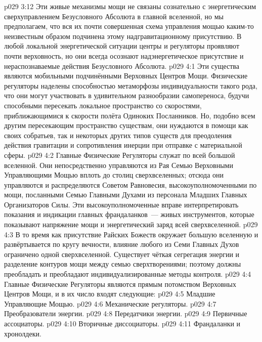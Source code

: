 \vs p029 3:12 Эти живые механизмы мощи не связаны сознательно с энергетическим сверхуправлением Безусловного Абсолюта в главной вселенной, но мы предполагаем, что вся их почти совершенная схема управления мощью каким\hyp{}то неизвестным образом подчинена этому надгравитационному присутствию. В любой локальной энергетической ситуации центры и регуляторы проявляют почти верховность, но они всегда осознают надэнергетическое присутствие и нераспознаваемые действия Безусловного Абсолюта.
\vs p029 4:1 Эти существа являются мобильными подчинёнными Верховных Центров Мощи. Физические регуляторы наделены способностью метаморфозы индивидуальности такого рода, что они могут участвовать в удивительном разнообразии самопереноса, будучи способными пересекать локальное пространство со скоростями, приближающимися к скорости полёта Одиноких Посланников. Но, подобно всем другим пересекающим пространство существам, они нуждаются в помощи как своих собратьев, так и некоторых других типов существ для преодоления действия гравитации и сопротивления инерции при отправке с материальной сферы.
\vs p029 4:2 Главные Физические Регуляторы служат по всей большой вселенной. Они непосредственно управляются из Рая Семью Верховными Управляющими Мощью вплоть до столиц сверхвселенных; отсюда они управляются и распределяются Советом Равновесия, высокоуполномоченными по мощи, посланными Семью Главными Духами из персонала Младших Главных Организаторов Силы. Эти высокоуполномоченные вправе интерпретировать показания и индикации главных франдаланков~--- живых инструментов, которые показывают напряжение мощи и энергетический заряд всей сверхвселенной.
\vs p029 4:3 В то время как присутствие Райских Божеств окружает большую вселенную и развёртывается по кругу вечности, влияние любого из Семи Главных Духов ограничено одной сверхвселенной. Существует чёткая сегрегация энергии и разделение контуров мощи между семью сверхтворениями; поэтому должны преобладать и преобладают индивидуализированные методы контроля.
\vs p029 4:4 \pc Главные Физические Регуляторы являются прямым потомством Верховных Центров Мощи, и в их число входят следующие:
\vs p029 4:5 Младшие Управляющие Мощью.
\vs p029 4:6 Механические регуляторы.
\vs p029 4:7 Преобразователи энергии.
\vs p029 4:8 Передатчики энергии.
\vs p029 4:9 Первичные ассоциаторы.
\vs p029 4:10 Вторичные диссоциаторы.
\vs p029 4:11 Франдаланки и хронолдеки.
